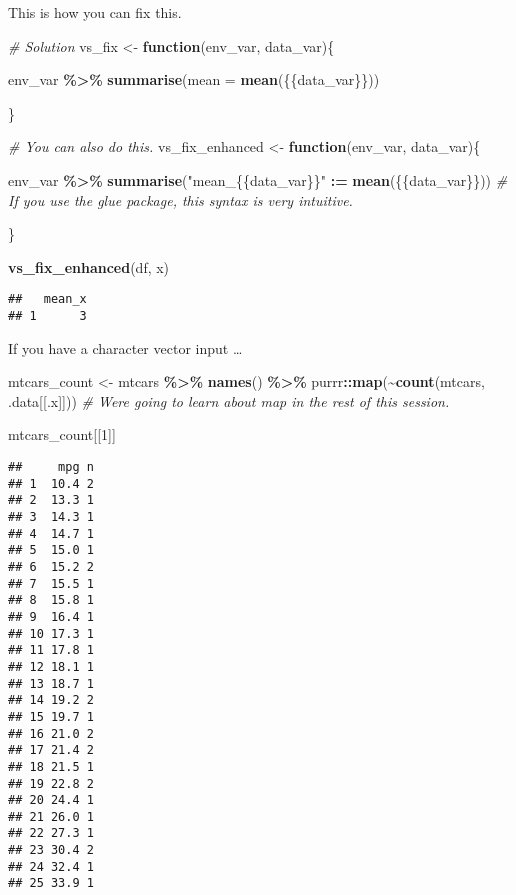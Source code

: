 \documentclass[
]{book}
\newenvironment{Shaded}{\begin{snugshade}}{\end{snugshade}}
\newcommand{\CommentTok}[1]{\textcolor[rgb]{0.56,0.35,0.01}{\textit{#1}}}
\newcommand{\ControlFlowTok}[1]{\textcolor[rgb]{0.13,0.29,0.53}{\textbf{#1}}}
\newcommand{\DataTypeTok}[1]{\textcolor[rgb]{0.13,0.29,0.53}{#1}}
\newcommand{\DecValTok}[1]{\textcolor[rgb]{0.00,0.00,0.81}{#1}}
\newcommand{\ErrorTok}[1]{\textcolor[rgb]{0.64,0.00,0.00}{\textbf{#1}}}
\newcommand{\KeywordTok}[1]{\textcolor[rgb]{0.13,0.29,0.53}{\textbf{#1}}}
\newcommand{\NormalTok}[1]{#1}
\newcommand{\OperatorTok}[1]{\textcolor[rgb]{0.81,0.36,0.00}{\textbf{#1}}}
\newcommand{\StringTok}[1]{\textcolor[rgb]{0.31,0.60,0.02}{#1}}
\begin{document}
This is how you can fix this.

\begin{Shaded}
\begin{Highlighting}[]
\CommentTok{\# Solution}
\NormalTok{vs\_fix \textless{}{-}}\StringTok{ }\ControlFlowTok{function}\NormalTok{(env\_var, data\_var)\{}
 
\NormalTok{   env\_var }\OperatorTok{\%\textgreater{}\%}
\StringTok{    }\KeywordTok{summarise}\NormalTok{(}\DataTypeTok{mean =} \KeywordTok{mean}\NormalTok{(\{\{data\_var\}\}))}

\NormalTok{\}}

\CommentTok{\# You can also do this. }
\NormalTok{vs\_fix\_enhanced \textless{}{-}}\StringTok{ }\ControlFlowTok{function}\NormalTok{(env\_var, data\_var)\{}
 
\NormalTok{   env\_var }\OperatorTok{\%\textgreater{}\%}
\StringTok{    }\KeywordTok{summarise}\NormalTok{(}\StringTok{"mean\_\{\{data\_var\}\}"} \OperatorTok{:}\ErrorTok{=}\StringTok{ }\KeywordTok{mean}\NormalTok{(\{\{data\_var\}\})) }\CommentTok{\# If you use the glue package, this syntax is very intuitive.}

\NormalTok{\}}

\KeywordTok{vs\_fix\_enhanced}\NormalTok{(df, x)}
\end{Highlighting}
\end{Shaded}

\begin{verbatim}
##   mean_x
## 1      3
\end{verbatim}

If you have a character vector input \ldots{}

\begin{Shaded}
\begin{Highlighting}[]
\NormalTok{mtcars\_count \textless{}{-}}\StringTok{ }\NormalTok{mtcars }\OperatorTok{\%\textgreater{}\%}
\StringTok{  }\KeywordTok{names}\NormalTok{() }\OperatorTok{\%\textgreater{}\%}
\StringTok{  }\NormalTok{purrr}\OperatorTok{::}\KeywordTok{map}\NormalTok{(}\OperatorTok{\textasciitilde{}}\KeywordTok{count}\NormalTok{(mtcars, .data[[.x]])) }\CommentTok{\# We\textquotesingle{}re going to learn about map in the rest of this session.}

\NormalTok{mtcars\_count[[}\DecValTok{1}\NormalTok{]]}
\end{Highlighting}
\end{Shaded}

\begin{verbatim}
##     mpg n
## 1  10.4 2
## 2  13.3 1
## 3  14.3 1
## 4  14.7 1
## 5  15.0 1
## 6  15.2 2
## 7  15.5 1
## 8  15.8 1
## 9  16.4 1
## 10 17.3 1
## 11 17.8 1
## 12 18.1 1
## 13 18.7 1
## 14 19.2 2
## 15 19.7 1
## 16 21.0 2
## 17 21.4 2
## 18 21.5 1
## 19 22.8 2
## 20 24.4 1
## 21 26.0 1
## 22 27.3 1
## 23 30.4 2
## 24 32.4 1
## 25 33.9 1
\end{verbatim}
\end{document}
